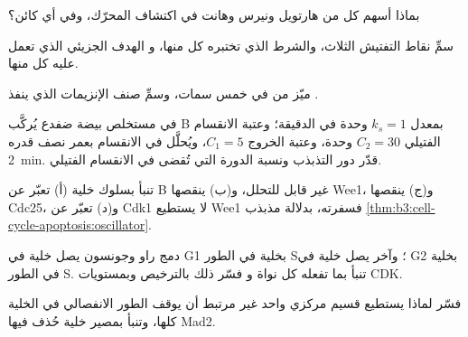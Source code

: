 \begin{exercise}[$\star$]\label{exo:b3:cell-cycle-apoptosis:2}
بماذا أسهم كل من هارتويل ونيرس وهانت في اكتشاف
المحرّك، وفي أي كائن؟
\end{exercise}

\begin{exercise}[$\star$]\label{exo:b3:cell-cycle-apoptosis:3}
سمِّ نقاط التفتيش الثلاث، والشرط الذي تختبره كل منها، و
الهدف الجزيئي الذي تعمل عليه كل منها.
\end{exercise}

\begin{exercise}[$\star$]\label{exo:b3:cell-cycle-apoptosis:4}
ميّز  من  في خمس سمات، وسمِّ
صنف الإنزيمات الذي ينفذ .
\end{exercise}

\begin{exercise}[$\star\star$]\label{exo:b3:cell-cycle-apoptosis:5}
في مستخلص بيضة ضفدع يُركَّب  B بمعدل $k_{s} = 1$ وحدة في
الدقيقة؛ وعتبة الانقسام الفتيلي $C_{2} = 30$ وحدة، وعتبة الخروج
$C_{1} = 5$، ويُحلَّل  في الانقسام بعمر نصف قدره
\qty{2}{min}. قدّر دور التذبذب ونسبة
الدورة التي تُقضى في الانقسام الفتيلي.
\end{exercise}

\begin{exercise}[$\star\star$]\label{exo:b3:cell-cycle-apoptosis:6}
تنبأ بسلوك خلية (أ) تعبّر عن  B غير قابل
للتحلل، و(ب) ينقصها Wee1، و(ج) ينقصها Cdc25، و(د) تعبّر عن Cdk1
لا يستطيع Wee1 فسفرته، بدلالة مذبذب
\cref{thm:b3:cell-cycle-apoptosis:oscillator}.
\end{exercise}

\begin{exercise}[$\star\star$]\label{exo:b3:cell-cycle-apoptosis:7}
دمج راو وجونسون يصل خلية في G1 بخلية في الطور S؛ وآخر
يصل خلية في G2 بخلية في الطور S. تنبأ بما تفعله كل نواة و
فسّر ذلك بالترخيص وبمستويات CDK.
\end{exercise}

\begin{exercise}[$\star\star$]\label{exo:b3:cell-cycle-apoptosis:8}
فسّر لماذا يستطيع قسيم مركزي واحد غير مرتبط أن يوقف الطور الانفصالي
في الخلية كلها، وتنبأ بمصير خلية حُذف فيها
Mad2.
\end{exercise}

